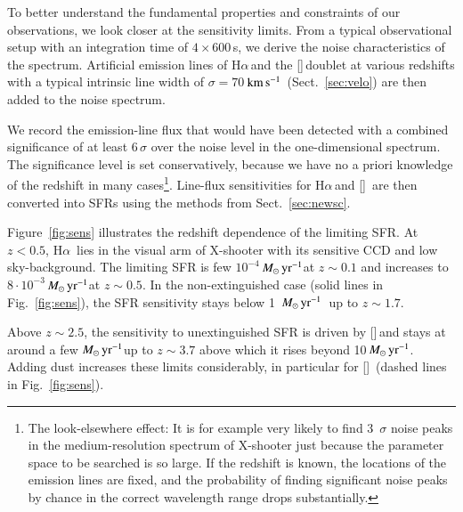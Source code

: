 \documentclass[traditabstract, longauth]{aa}
\newcommand{\kms}{$\rm{km\,s^{-1}}$}
\newcommand{\ha}{H$\alpha$}
\newcommand{\oii}{[\ion{O}{ii}]}
\newcommand{\Msunyr}{$M_\odot\,\rm{yr}^{-1}$}
\begin{document}
To better understand the fundamental properties and constraints of our observations, we look closer at the sensitivity limits. From a typical observational setup with an integration time of $4\times600$\,s, we derive the noise characteristics of the spectrum. Artificial emission lines of \ha\,and the \oii\,doublet at various redshifts with a typical intrinsic line width of $\sigma= 70$\,\kms\, (Sect.~\ref{sec:velo}) are then added to the noise spectrum. 

We record the emission-line flux that would have been detected with a combined significance of at least 6\,$\sigma$ over the noise level in the one-dimensional spectrum. The significance level is set conservatively, because we have no a priori knowledge of the redshift in many cases\footnote{The look-elsewhere effect: It is for example very likely to find 3~$\sigma$ noise peaks in the medium-resolution spectrum of X-shooter just because the parameter space to be searched is so large. If the redshift is known, the locations of the emission lines are fixed, and the probability of finding significant noise peaks by chance in the correct wavelength range drops substantially.}. Line-flux sensitivities for \ha\,and \oii\, are then converted into SFRs using the methods from Sect.~\ref{sec:newsc}.

Figure~\ref{fig:sens} illustrates the redshift dependence of the limiting SFR. At $z<0.5$, \ha\, lies in the visual arm of X-shooter with its sensitive CCD and low sky-background. The limiting SFR is few $10^{-4}$\,\Msunyr at $z\sim0.1$ and increases to $8\cdot10^{-3}$\,\Msunyr at $z\sim0.5$. In the non-extinguished case (solid lines in Fig.~\ref{fig:sens}), the SFR sensitivity stays below 1~\Msunyr\, up to $z\sim1.7$.

Above $z\sim2.5$, the sensitivity to unextinguished SFR is driven by \oii\,and stays at around a few \Msunyr up to $z\sim3.7$ above which it rises beyond 10\,\Msunyr. Adding dust increases these limits considerably, in particular for \oii\, (dashed lines in Fig.~\ref{fig:sens}). 
\end{document}
